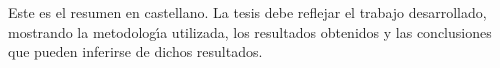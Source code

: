 \begin{resumen}
Este es el resumen en castellano. La tesis debe reflejar el trabajo desarrollado, mostrando la metodolog\'{\i}a utilizada, los resultados obtenidos y las conclusiones que pueden inferirse de dichos resultados.
\end{resumen}

